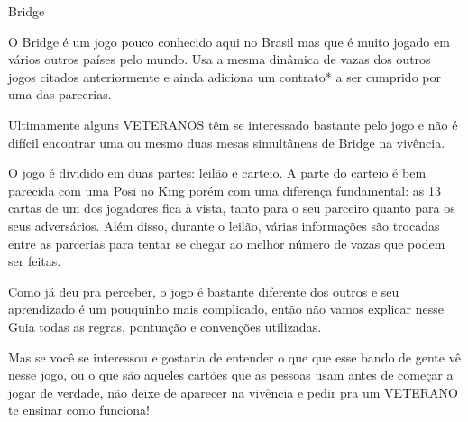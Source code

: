 \begin{subsecao}{Bridge}

O Bridge é um jogo pouco conhecido aqui no Brasil mas que é muito jogado em
 vários outros países pelo mundo. Usa a mesma dinâmica de vazas dos outros jogos
 citados anteriormente e ainda adiciona um contrato* a ser cumprido por uma das
 parcerias.

Ultimamente alguns VETERANOS têm se interessado bastante pelo jogo e não é difícil
 encontrar uma ou mesmo duas mesas simultâneas de Bridge na vivência.

O jogo é dividido em duas partes: leilão e carteio. A parte do carteio é bem
 parecida com uma Posi no King porém com uma diferença fundamental: as 13 cartas
 de um dos jogadores fica à vista, tanto para o seu parceiro quanto para os seus
 adversários. Além disso, durante o leilão, várias informações são trocadas
 entre as parcerias para tentar se chegar ao melhor número de vazas que podem ser
 feitas.

Como já deu pra perceber, o jogo é bastante diferente dos outros e seu aprendizado
 é um pouquinho mais complicado, então não vamos explicar nesse Guia todas as regras,
 pontuação e convenções utilizadas.

Mas se você se interessou e gostaria de entender o que que esse bando de gente
 vê nesse jogo, ou o que são aqueles cartões que as pessoas usam antes de começar
 a jogar de verdade, não deixe de aparecer na vivência e pedir pra um VETERANO
 te ensinar como funciona!

\end{subsecao}
